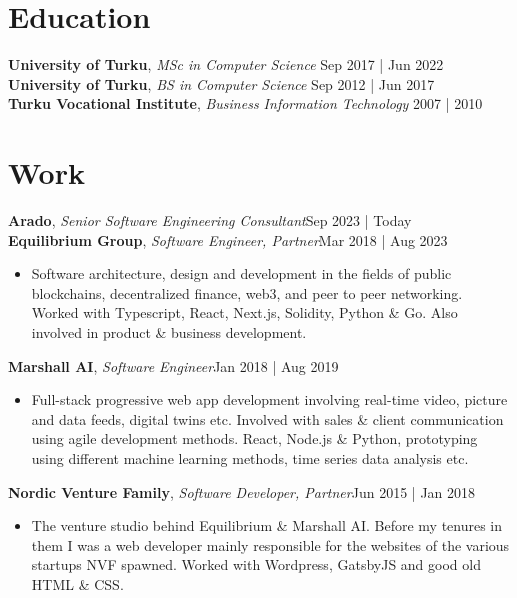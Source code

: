 \documentclass[line,margin]{res}
\begin{document}
\address{jani.anttonen@protonmail.ch | Turku, Finland | https://janianttonen.com}

\begin{resume}
	\vspace{-5mm}

	\section{Education}
	\textbf{University of Turku}, {\sl MSc in Computer Science} \hfill Sep 2017 | Jun 2022\\
	\textbf{University of Turku}, {\sl BS in Computer Science} \hfill Sep 2012 | Jun 2017\\
	\textbf{Turku Vocational Institute}, {\sl Business Information Technology} \hfill 2007 | 2010\\

	\section{Work}
	\textbf{Arado}, {\sl Senior Software Engineering Consultant}\hfill Sep 2023 | Today\\

	\textbf{Equilibrium Group}, {\sl Software Engineer, Partner}\hfill Mar 2018 | Aug 2023\\
	\begin{itemize} \itemsep 3pt
	\item Software architecture, design and development in the fields of public blockchains, decentralized finance, web3, and peer to peer networking. Worked with Typescript, React, Next.js, Solidity, Python \& Go. Also involved in product \& business development.
	\end{itemize}

	\textbf{Marshall AI}, {\sl Software Engineer}\hfill Jan 2018 | Aug 2019\\
	\begin{itemize} \itemsep 3pt
	\item Full-stack progressive web app development involving real-time video, picture and data feeds, digital twins etc. Involved with sales \& client communication using agile development methods. React, Node.js \& Python, prototyping using different machine learning methods, time series data analysis etc.
	\end{itemize}

	\textbf{Nordic Venture Family}, {\sl Software Developer, Partner}\hfill Jun 2015 | Jan 2018\\
	\begin{itemize} \itemsep 3pt
	\item The venture studio behind Equilibrium \& Marshall AI. Before my tenures in them I was a web developer mainly responsible for the websites of the various startups NVF spawned. Worked with Wordpress, GatsbyJS and good old HTML \& CSS.
	\end{itemize}


\end{resume}
\end{document}
